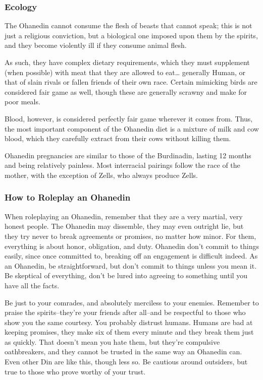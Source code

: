 \documentclass[oneside,11pt,english]{book}
\begin{document}
\subsubsection*{Ecology} 
The Ohanedin cannot consume the flesh of beasts that cannot speak; this is not just a religious conviction, 
but a biological one imposed upon them by the spirits, and they become violently ill if they consume animal flesh. 


As such, they have complex dietary requirements, which they must supplement (when possible) with meat 
that they are allowed to eat… generally Human, or that of slain rivals or fallen friends of their own race. 
Certain mimicking birds are considered fair game as well, though these are generally scrawny and make 
for poor meals. 


Blood, however, is considered perfectly fair game wherever it comes from. Thus, the most important component of the Ohanedin diet is a mixture of milk and cow blood, which they carefully extract from 
their cows without killing them. 


Ohanedin pregnancies are similar to those of the Burdinadin, lasting 12 months and being relatively 
painless. Most interracial pairings follow the race of the mother, with the exception of Zells, who always 
produce Zells. 
\subsubsection{How to Roleplay an Ohanedin}
When roleplaying an Ohanedin, remember that they are a very martial, very honest people. The Ohanedin 
may dissemble, they may even outright lie, but they try never to break agreements or promises, no matter 
how minor. For them, everything is about honor, obligation, and duty. Ohanedin don’t commit to things 
easily, since once committed to, breaking off an engagement is difficult indeed. As an Ohanedin, be 
straightforward, but don’t commit to things unless you mean it. Be skeptical of everything, don’t be lured 
into agreeing to something until you have all the facts. 

Be just to your comrades, and absolutely merciless to your enemies. Remember to praise the spirits--they’re your friends after all--and be respectful to those 
who show you the same courtesy. You probably distrust humans. Humans are bad at keeping promises, 
they make six of them every minute and they break them just as quickly. That doesn’t mean you hate 
them, but they’re compulsive oathbreakers, and they cannot be trusted in the same way an Ohanedin can. 
Even other Din are like this, though less so. Be cautious around outsiders, but true to those who prove 
worthy of your trust. 
\end{document}
